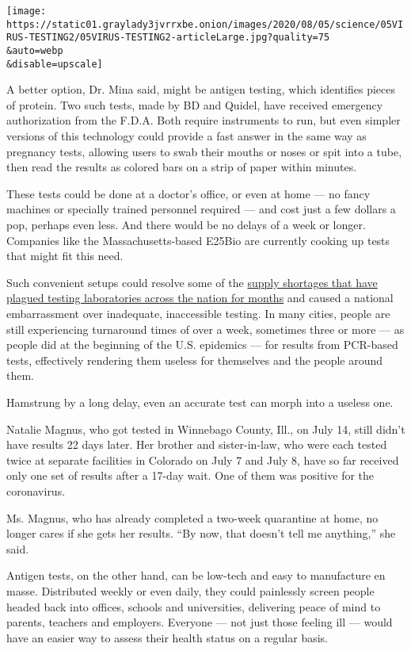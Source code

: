 \texttt{[image: https://static01.graylady3jvrrxbe.onion/images/2020/08/05/science/05VIRUS-TESTING2/05VIRUS-TESTING2-articleLarge.jpg?quality=75\\\&auto=webp\\\&disable=upscale]}

A better option, Dr. Mina said, might be antigen testing, which
identifies pieces of protein. Two such tests, made by BD and Quidel,
have received emergency authorization from the F.D.A. Both require
instruments to run, but even simpler versions of this technology could
provide a fast answer in the same way as pregnancy tests, allowing users
to swab their mouths or noses or spit into a tube, then read the results
as colored bars on a strip of paper within minutes.

These tests could be done at a doctor's office, or even at home --- no
fancy machines or specially trained personnel required --- and cost just
a few dollars a pop, perhaps even less. And there would be no delays of
a week or longer. Companies like the Massachusetts-based E25Bio are
currently cooking up tests that might fit this need.

Such convenient setups could resolve some of the
\href{https://www.nytimes3xbfgragh.onion/2020/07/23/health/coronavirus-testing-supply-shortage.html}{supply
shortages that have plagued testing laboratories across the nation for
months} and caused a national embarrassment over inadequate,
inaccessible testing. In many cities, people are still experiencing
turnaround times of over a week, sometimes three or more --- as people
did at the beginning of the U.S. epidemics --- for results from
PCR-based tests, effectively rendering them useless for themselves and
the people around them.

Hamstrung by a long delay, even an accurate test can morph into a
useless one.

Natalie Magnus, who got tested in Winnebago County, Ill., on July 14,
still didn't have results 22 days later. Her brother and sister-in-law,
who were each tested twice at separate facilities in Colorado on July 7
and July 8, have so far received only one set of results after a 17-day
wait. One of them was positive for the coronavirus.

Ms. Magnus, who has already completed a two-week quarantine at home, no
longer cares if she gets her results. ``By now, that doesn't tell me
anything,'' she said.

Antigen tests, on the other hand, can be low-tech and easy to
manufacture en masse. Distributed weekly or even daily, they could
painlessly screen people headed back into offices, schools and
universities, delivering peace of mind to parents, teachers and
employers. Everyone --- not just those feeling ill --- would have an
easier way to assess their health status on a regular basis.

